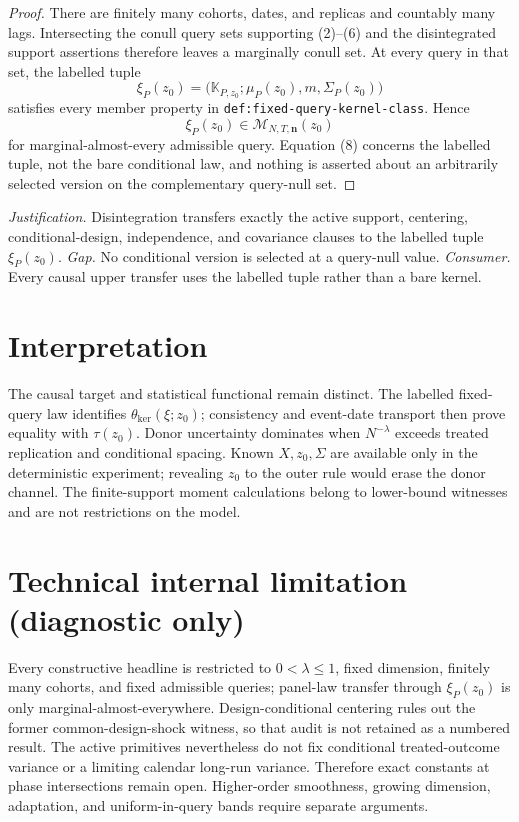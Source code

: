 \documentclass{article}
\begin{document}
\begin{proof}
There are finitely many cohorts, dates, and replicas and countably many lags.  Intersecting the conull query sets supporting (2)--(6) and the disintegrated support assertions therefore leaves a marginally conull set.  At every query in that set, the labelled tuple
\[
 \xi_P(z_0)=\bigl(\mathbb K_{P,z_0};\mu_P(z_0),m,
 \Sigma_P(z_0)\bigr)                                       \tag{7}
\]
satisfies every member property in \texttt{def:fixed-query-kernel-class}.  Hence
\[
 \xi_P(z_0)\in\mathcal M_{N,T,\mathbf n}(z_0)              \tag{8}
\]
for marginal-almost-every admissible query.  Equation (8) concerns the labelled tuple, not the bare conditional law, and nothing is asserted about an arbitrarily selected version on the complementary query-null set.
\end{proof}
\par\smallskip\noindent \textit{Justification.} Disintegration transfers exactly the active support, centering, conditional-design, independence, and covariance clauses to the labelled tuple \(\xi_P(z_0)\). \textit{Gap.} No conditional version is selected at a query-null value. \textit{Consumer.} Every causal upper transfer uses the labelled tuple rather than a bare kernel.

\section{Interpretation}

The causal target and statistical functional remain distinct. The labelled fixed-query law identifies \(\theta_{\mathrm{ker}}(\xi;z_0)\); consistency and event-date transport then prove equality with \(\tau(z_0)\). Donor uncertainty dominates when \(N^{-\lambda}\) exceeds treated replication and conditional spacing. Known \(X,z_0,\Sigma\) are available only in the deterministic experiment; revealing \(z_0\) to the outer rule would erase the donor channel. The finite-support moment calculations belong to lower-bound witnesses and are not restrictions on the model.

\section*{Technical internal limitation (diagnostic only)}

Every constructive headline is restricted to \(0<\lambda\le1\), fixed dimension, finitely many cohorts, and fixed admissible queries; panel-law transfer through \(\xi_P(z_0)\) is only marginal-almost-everywhere. Design-conditional centering rules out the former common-design-shock witness, so that audit is not retained as a numbered result. The active primitives nevertheless do not fix conditional treated-outcome variance or a limiting calendar long-run variance. Therefore exact constants at phase intersections remain open. Higher-order smoothness, growing dimension, adaptation, and uniform-in-query bands require separate arguments.
\end{document}
